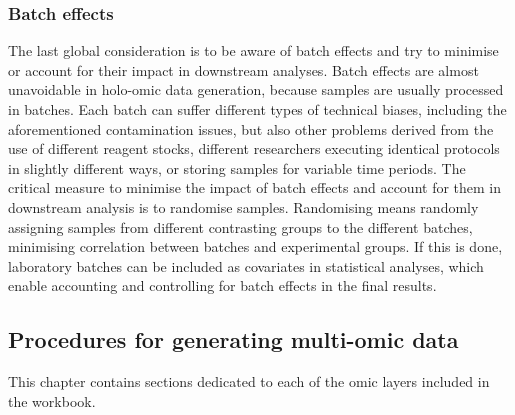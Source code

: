 \documentclass[
]{book}
\begin{document}
\hypertarget{batch-effects}{%
\subsubsection*{Batch effects}\label{batch-effects}}

The last global consideration is to be aware of batch effects and try to minimise or account for their impact in downstream analyses. Batch effects are almost unavoidable in holo-omic data generation, because samples are usually processed in batches. Each batch can suffer different types of technical biases, including the aforementioned contamination issues, but also other problems derived from the use of different reagent stocks, different researchers executing identical protocols in slightly different ways, or storing samples for variable time periods. The critical measure to minimise the impact of batch effects and account for them in downstream analysis is to randomise samples. Randomising means randomly assigning samples from different contrasting groups to the different batches, minimising correlation between batches and experimental groups. If this is done, laboratory batches can be included as covariates in statistical analyses, which enable accounting and controlling for batch effects in the final results.

\hypertarget{laboratory-procedures}{%
\subsection*{Procedures for generating multi-omic data}\label{laboratory-procedures}}

This chapter contains sections dedicated to each of the omic layers included in the workbook.
\end{document}
